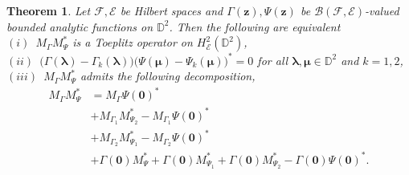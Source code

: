 \documentclass[12pt]{amsart}
\newtheorem{thm}[propn]{Theorem}
\theoremstyle{definition}
\newcommand{\D}{\mathbb{D}}
\newcommand{\1}{{\mbox{\bf 1}}}
\newcommand{\clb}{\mathcal{B}}
\newcommand{\cle}{\mathcal{E}}
\newcommand{\clf}{\mathcal{F}}
\begin{document}
\begin{thm}\label{bidisc}
Let $\clf, \cle$ be Hilbert spaces and $\Gamma(\bm{z}), \Psi(\bm{z})$ be $\clb(\clf,\cle)$-valued bounded analytic functions on $\D^2$. Then the following are equivalent \\ \vspace{1mm}
$(i)$~$M_{\Gamma}M_{\Psi}^*$ is a Toeplitz operator on $H_{\cle}^2(\D^2)$, \\ \vspace{1mm}
$(ii)$~$\big( \Gamma(\bm{\lambda}) - \Gamma_k(\bm{\lambda})\big) \big(  \Psi(\bm{\mu}) - \Psi_k(\bm{\mu}) \big)^* = 0$ for all $\bm{\lambda}, \bm{\mu} \in \D^2$ and $k=1,2$,\\ \vspace{1mm}
$(iii)$~$M_{\Gamma}M_{\Psi}^*$ admits the following decomposition,
\begin{align*}
M_{\Gamma}M_{\Psi}^*  &=  M_{\Gamma} \Psi(\bm{0})^*\\
&+M_{\Gamma_1} M_{\Psi_2}^* - M_{\Gamma_1} \Psi(\bm{0})^*\\
&+M_{\Gamma_2} M_{\Psi_1}^*  - M_{\Gamma_2} \Psi(\bm{0})^* \\
& + \Gamma(\bm{0}) M_{\Psi}^* + \Gamma(\bm{0}) M_{\Psi_1}^* + \Gamma(\bm{0}) M_{\Psi_2}^*- \Gamma(\bm{0}) \Psi(\bm{0})^*.
\end{align*}
\end{thm}
\end{document}
